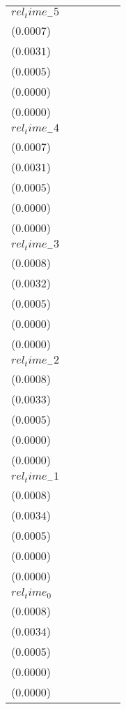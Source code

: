 \begin{tabular}{llllll}
$rel_time_-5$       &    \makecell{$-0.0010^{}$ \\ ($0.0007$)} &   \makecell{$-0.0054^{*}$ \\ ($0.0031$)} &  \makecell{$0.0049^{***}$ \\ ($0.0005$)} &  \makecell{$0.0004^{***}$ \\ ($0.0000$)} &  \makecell{$0.0001^{***}$ \\ ($0.0000$)} \\
$rel_time_-4$       &    \makecell{$-0.0006^{}$ \\ ($0.0007$)} &    \makecell{$-0.0041^{}$ \\ ($0.0031$)} &  \makecell{$0.0039^{***}$ \\ ($0.0005$)} &  \makecell{$0.0003^{***}$ \\ ($0.0000$)} &  \makecell{$0.0001^{***}$ \\ ($0.0000$)} \\
$rel_time_-3$       &     \makecell{$0.0001^{}$ \\ ($0.0008$)} &    \makecell{$-0.0014^{}$ \\ ($0.0032$)} &  \makecell{$0.0024^{***}$ \\ ($0.0005$)} &  \makecell{$0.0002^{***}$ \\ ($0.0000$)} &  \makecell{$0.0001^{***}$ \\ ($0.0000$)} \\
$rel_time_-2$       &    \makecell{$-0.0000^{}$ \\ ($0.0008$)} &    \makecell{$-0.0018^{}$ \\ ($0.0033$)} &  \makecell{$0.0029^{***}$ \\ ($0.0005$)} &  \makecell{$0.0002^{***}$ \\ ($0.0000$)} &  \makecell{$0.0001^{***}$ \\ ($0.0000$)} \\
$rel_time_-1$       &     \makecell{$0.0010^{}$ \\ ($0.0008$)} &     \makecell{$0.0028^{}$ \\ ($0.0034$)} &  \makecell{$0.0049^{***}$ \\ ($0.0005$)} &  \makecell{$0.0004^{***}$ \\ ($0.0000$)} &  \makecell{$0.0001^{***}$ \\ ($0.0000$)} \\
$rel_time_0$        &     \makecell{$0.0006^{}$ \\ ($0.0008$)} &     \makecell{$0.0014^{}$ \\ ($0.0034$)} &  \makecell{$0.0045^{***}$ \\ ($0.0005$)} &  \makecell{$0.0003^{***}$ \\ ($0.0000$)} &  \makecell{$0.0001^{***}$ \\ ($0.0000$)} \\

\end{tabular}
